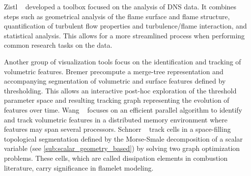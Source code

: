 %
Zistl \etal~\cite{Zistl2009} developed a toolbox focused on the analysis of
\ac{DNS} data.
%
It combines steps such as geometrical analysis of the flame surface and flame
structure, quantification of turbulent flow properties and turbulence/flame
interaction, and statistical analysis.
%
This allows for a more streamlined process when performing common research
tasks on the data.
%

%
Another group of visualization tools focus on the identification and tracking of
volumetric features.
%
Bremer \etal precompute a merge-tree representation and accompanying
segmentation of volumetric \cite{Bremer2009,Bremer2011} and surface features
\cite{Bremer2010} defined by thresholding.
%
This allows an interactive post-hoc exploration of the threshold parameter
space and resulting tracking graph representing the evolution of features over
time.
%
Wang \etal~\cite{Wang2013} focuses on an efficient parallel algorithm to
identify and track volumetric features in a distributed memory environment
where features may span several processors.
%
Schnorr \etal~\cite{Schnorr2018} track cells in a space-filling topological
segmentation defined by the Morse-Smale decomposition of a scalar variable (see
\cref{sub:scalar_geometry_based}) by solving two graph optimization problems.
%
These cells, which are called dissipation elements in combustion literature,
carry significance in flamelet modeling.
%

